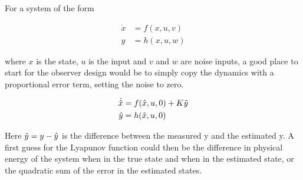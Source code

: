 For a system of the form 

\begin{align}
    \Dot{x} &= f(x,u,v) \\
    y &= h(x,u,w)
\end{align}

where $x$ is the state, $u$ is the input and $v$ and $w$ are noise inputs, a good place to start for the observer design would be to simply copy the dynamics with a proportional error term, setting the noise to zero.

\begin{align}
    \Dot{\hat{x}} &= f(\hat{x}, u, 0) + K\Tilde{y} \\
    \hat{y} &= h(\hat{x}, u, 0)
\end{align}

Here $\Tilde{y} = y -  \hat{y}$ is the difference between the measured y and the estimated y. A first guess for the Lyapunov function could then be the difference in physical energy of the system when in the true state and when in the estimated state, or the quadratic sum of the error in the estimated states. 